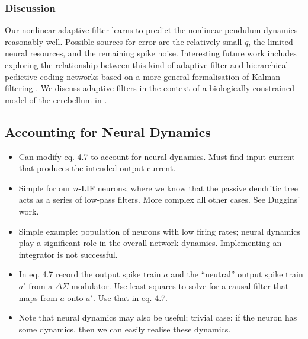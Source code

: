 \subsubsection{Discussion}

Our nonlinear adaptive filter learns to predict the nonlinear pendulum dynamics reasonably well.
Possible sources for error are the relatively small $q$, the limited neural resources, and the remaining spike noise.
Interesting future work includes exploring the relationship between this kind of adaptive filter and hierarchical pedictive coding networks based on a more general formalisation of Kalman filtering \citep{bastos2012canonical}.
We discuss adaptive filters in the context of a biologically constrained model of the cerebellum in .


\clearpage

\subsection{Accounting for Neural Dynamics}
\label{sec:temporal_tuning_neural_dynamics}

\begin{itemize}
	\item Can modify eq. 4.7 to account for neural dynamics. Must find input current that produces the intended output current.
	\item Simple for our $n$-LIF neurons, where we know that the passive dendritic tree acts as a series of low-pass filters. More complex all other cases. See Duggins' work.
	\item Simple example: population of \LIF neurons with low firing rates; neural dynamics play a significant role in the overall network dynamics. Implementing an integrator is not successful.
	\item In eq. 4.7 record the output spike train $a$ and the \enquote{neutral} output spike train $a'$ from a $\Delta\Sigma$ modulator. Use least squares to solve for a causal filter that maps from $a$ onto $a'$. Use that in eq. 4.7.
	\item Note that neural dynamics may also be useful; trivial case: if the neuron has some dynamics, then we can easily realise these dynamics.
\end{itemize}
